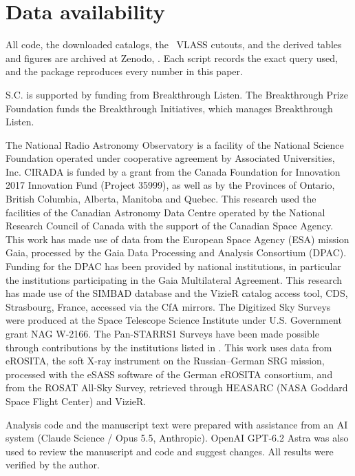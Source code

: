 \documentclass[linenumbers]{aastex702}
\begin{document}
\section{Data availability} \label{sec:data_avail}

All code, the downloaded catalogs, the \NCutoutsAll\ VLASS cutouts, and the derived tables and figures are archived at Zenodo, . Each script records the exact query used, and the package reproduces every number in this paper.

\begin{acknowledgments}

S.C. is supported by funding from Breakthrough Listen. The Breakthrough Prize Foundation funds the Breakthrough Initiatives, which manages Breakthrough Listen.

The National Radio Astronomy Observatory is a facility of the National Science Foundation operated under cooperative agreement by Associated Universities, Inc. CIRADA is funded by a grant from the Canada Foundation for Innovation 2017 Innovation Fund (Project 35999), as well as by the Provinces of Ontario, British Columbia, Alberta, Manitoba and Quebec. This research used the facilities of the Canadian Astronomy Data Centre operated by the National Research Council of Canada with the support of the Canadian Space Agency. This work has made use of data from the European Space Agency (ESA) mission Gaia, processed by the Gaia Data Processing and Analysis Consortium (DPAC). Funding for the DPAC has been provided by national institutions, in particular the institutions participating in the Gaia Multilateral Agreement. This research has made use of the SIMBAD database and the VizieR catalog access tool, CDS, Strasbourg, France, accessed via the CfA mirrors. The Digitized Sky Surveys were produced at the Space Telescope Science Institute under U.S. Government grant NAG W-2166. The Pan-STARRS1 Surveys have been made possible through contributions by the institutions listed in \citet{Chambers2016}. This work uses data from eROSITA, the soft X-ray instrument on the Russian--German SRG mission, processed with the eSASS software of the German eROSITA consortium, and from the ROSAT All-Sky Survey, retrieved through HEASARC (NASA Goddard Space Flight Center) and VizieR.

Analysis code and the manuscript text were prepared with assistance from an AI system (Claude Science / Opus 5.5, Anthropic). OpenAI GPT-6.2 Astra was also used to review the manuscript and code and suggest changes.  All results were verified by the author.
\end{acknowledgments}
\end{document}
